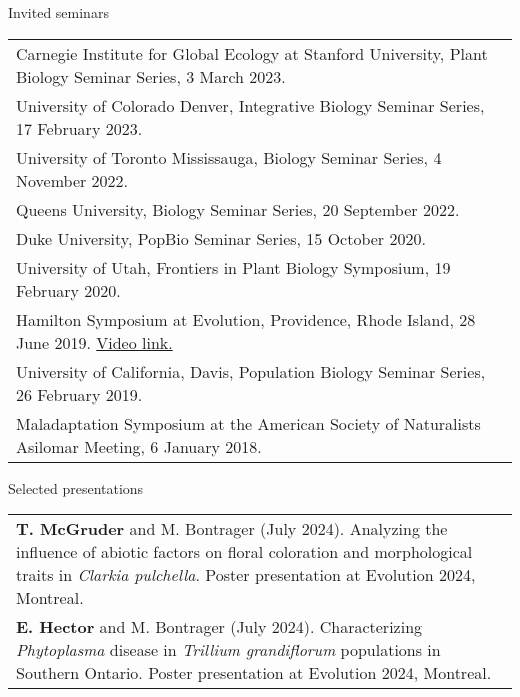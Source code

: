 \documentclass[letterpaper,11pt,oneside]{article}
\begin{document}
\noindent\Large{Invited seminars} 

\normalsize
\medskip

\def\arraystretch{1.3}
\noindent \begin{tabular}{@{} >{\raggedright\arraybackslash}p{17.2cm}}
Carnegie Institute for Global Ecology at Stanford University, Plant Biology Seminar Series, 3 March 2023.\\
University of Colorado Denver, Integrative Biology Seminar Series, 17 February 2023.\\
University of Toronto Mississauga, Biology Seminar Series, 4 November 2022.\\ 
Queens University, Biology Seminar Series, 20 September 2022.\\
Duke University, PopBio Seminar Series, 15 October 2020.\\
University of Utah, Frontiers in Plant Biology Symposium, 19 February 2020.\\
Hamilton Symposium at Evolution, Providence, Rhode Island, 28 June 2019. \href{https://www.youtube.com/watch?v=UeK_zYEfVyA}{Video link.} \\
University of California, Davis, Population Biology Seminar Series, 26 February 2019. \\
Maladaptation Symposium at the American Society of Naturalists Asilomar Meeting, 6 January 2018.
\end{tabular}
\bigskip





\noindent\Large{Selected presentations}  
\normalsize
\medskip

\def\arraystretch{1.4}
\noindent \begin{tabular}{@{} >{\raggedright\arraybackslash}p{17.2cm}}
\hangindent=5mm\textbf{T. McGruder} and M. Bontrager (July 2024). Analyzing the influence of abiotic factors on
floral coloration and morphological traits in \textit{Clarkia pulchella}. Poster presentation at Evolution 2024, Montreal. \\
\hangindent=5mm\textbf{E. Hector} and M. Bontrager (July 2024). Characterizing \textit{Phytoplasma} disease in \textit{Trillium grandiflorum} populations in Southern Ontario. Poster presentation at Evolution 2024, Montreal. \\
\end{tabular}
\end{document}
